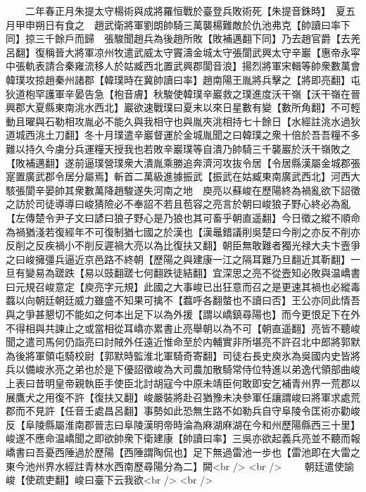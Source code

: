 　　二年春正月朱提太守楊術與成將羅恒戰於臺登兵敗術死【朱提音銖時】　夏五月甲申朔日有食之　趙武衛將軍劉朗帥騎三萬襲楊難敵於仇池弗克【帥讀曰率下同】掠三千餘戶而歸　張駿聞趙兵為後趙所敗【敗補邁翻下同】乃去趙官爵【去羌呂翻】復稱晉大將軍凉州牧遣武威太守竇濤金城太守張閬武興太守辛巖【惠帝永寜中張軌表請合秦雍流移人於姑臧西北置武興郡閬音浪】揚烈將軍宋輯等帥衆數萬會韓璞攻掠趙秦州諸郡【韓璞時在冀帥讀曰率】趙南陽王胤將兵擊之【將即亮翻】屯狄道枹罕護軍辛晏告急【枹音膚】秋駿使韓璞辛巖救之璞進度沃干嶺【沃干嶺在晉興郡大夏縣東南洮水西北】巖欲速戰璞曰夏末以來日星數有變【數所角翻】不可輕動且曜與石勒相攻胤必不能久與我相守也與胤夾洮相持七十餘日【水經註洮水過狄道城西洮土刀翻】冬十月璞遣辛巖督運於金城胤聞之曰韓璞之衆十倍於吾吾糧不多難以持久今虜分兵運糧天授我也若敗辛巖璞等自潰乃帥騎三千襲巖於沃干嶺敗之【敗補邁翻】遂前逼璞營璞衆大潰胤乘勝追奔濟河攻抜令居【令居縣漢屬金城郡張寔置廣武郡令居分屬焉】斬首二萬級進據振武【振武在姑臧東南廣武西北】河西大駭張閬辛晏帥其衆數萬降趙駿遂失河南之地　庾亮以蘇峻在歷陽終為禍亂欲下詔徵之訪於司徒導導曰峻猜險必不奉詔不若且苞容之亮言於朝曰峻狼子野心終必為亂【左傳楚令尹子文曰諺曰狼子野心是乃狼也其可畜乎朝直遥翻】今日徵之縱不順命為禍猶淺若復經年不可復制猶七國之於漢也【漢鼂錯議削吳楚曰今削之亦反不削亦反削之反疾禍小不削反遲禍大亮以為比復扶又翻】朝臣無敢難者獨光禄大夫卞壼爭之曰峻擁彊兵逼近京邑路不終朝【歷陽之與建康一江之隔耳難乃旦翻近其靳翻】一旦有變易為蹉跌【易以豉翻蹉七何翻跌徒結翻】宜深思之亮不從壼知必敗與温嶠書曰元規召峻意定【庾亮字元規】此國之大事峻已出狂意而召之是更速其禍也必縱毒蠚以向朝廷朝廷威力雖盛不知果可擒不【蠚呼各翻螫也不讀曰否】王公亦同此情吾與之爭甚懇切不能如之何本出足下以為外援【謂以嶠鎮尋陽也】而今更恨足下在外不得相與共諫止之或當相從耳嶠亦累書止亮舉朝以為不可【朝直遥翻】亮皆不聽峻聞之遣司馬何仍詣亮曰討賊外任遠近惟命至於内輔實非所堪亮不許召北中郎將郭默為後將軍領屯騎校尉【郭默時監淮北軍騎奇寄翻】司徒右長史庾氷為吳國内史皆將兵以備峻氷亮之弟也於是下優詔徵峻為大司農加散騎常侍位特進以弟逸代領部曲峻上表曰昔明皇帝親執臣手使臣北討胡寇今中原未靖臣何敢即安乞補青州界一荒郡以展鷹犬之用復不許【復扶又翻】峻嚴裝將赴召猶豫未决參軍任讓謂峻曰將軍求處荒郡而不見許【任音壬處昌呂翻】事勢如此恐無生路不如勒兵自守阜陵令匡術亦勸峻反【阜陵縣屬淮南郡晉志曰阜陵漢明帝時淪為麻湖麻湖在今和州歷陽縣西三十里】峻遂不應命温嶠聞之即欲帥衆下衛建康【帥讀曰率】三吳亦欲起義兵亮並不聽而報嶠書曰吾憂西陲過於歷陽【西陲謂陶侃也】足下無過雷池一步也【雷池即在大雷之東今池州界水經註青林水西南歷尋陽分為二】闕<br />
<br />
　　朝廷遣使諭峻【使疏吏翻】峻曰臺下云我欲<br />
<br />
